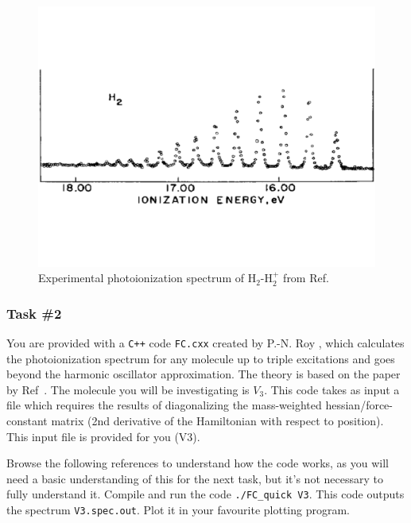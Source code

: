 \documentclass[12pt]{article}
\begin{document}
\begin{figure}
    \begin{center}
        \includegraphics[width=\linewidth]{../figures/H2-expspectrum.pdf}
    \end{center}
    \caption{
    Experimental photoionization spectrum of H$_2$-H$_2^+$ from Ref.~\cite{berkowitz1973comparison}
    }
    \label{fig:h2_spectrum}
\end{figure}

\subsubsection*{Task \#2}

You are provided with a \texttt{C++} code \texttt{FC.cxx} created by P.-N. Roy \cite{yang1995structure}, which calculates the photoionization spectrum for any molecule up to triple excitations and goes beyond the harmonic oscillator approximation. The theory is based on the paper by Ref~\cite{doktorov1977dynamical}. The molecule you will be investigating is $V_3$.
This code takes as input a file which requires the results of diagonalizing the mass-weighted hessian/force-constant matrix (2nd derivative of the Hamiltonian with respect to position). This input file is provided for you (V3).

Browse the following references to understand how the code works, as you will need a basic understanding of this for the next task, but it's not necessary to fully understand it. Compile and run the code \texttt{./FC\_quick V3}. This code outputs the spectrum \texttt{V3.spec.out}. Plot it in your favourite plotting program. 
\end{document}
